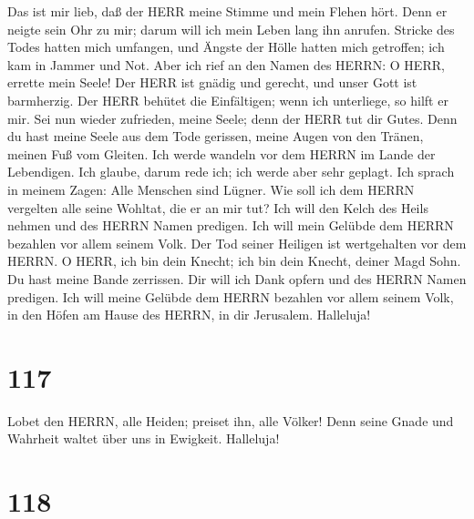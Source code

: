  Das ist mir lieb, daß der HERR meine Stimme und mein Flehen
hört.  Denn er neigte sein Ohr zu mir; darum will ich mein
Leben lang ihn anrufen.  Stricke des Todes hatten mich
umfangen, und Ängste der Hölle hatten mich getroffen; ich kam in Jammer
und Not.  Aber ich rief an den Namen des HERRN: O HERR,
errette mein Seele!  Der HERR ist gnädig und gerecht, und
unser Gott ist barmherzig.  Der HERR behütet die
Einfältigen; wenn ich unterliege, so hilft er mir.  Sei nun
wieder zufrieden, meine Seele; denn der HERR tut dir Gutes. 
Denn du hast meine Seele aus dem Tode gerissen, meine Augen von den
Tränen, meinen Fuß vom Gleiten.  Ich werde wandeln vor dem
HERRN im Lande der Lebendigen.  Ich glaube, darum rede ich;
ich werde aber sehr geplagt.  Ich sprach in meinem Zagen:
Alle Menschen sind Lügner.  Wie soll ich dem HERRN
vergelten alle seine Wohltat, die er an mir tut?  Ich will
den Kelch des Heils nehmen und des HERRN Namen predigen. 
Ich will mein Gelübde dem HERRN bezahlen vor allem seinem Volk.
 Der Tod seiner Heiligen ist wertgehalten vor dem HERRN.
 O HERR, ich bin dein Knecht; ich bin dein Knecht, deiner
Magd Sohn. Du hast meine Bande zerrissen.  Dir will ich
Dank opfern und des HERRN Namen predigen.  Ich will meine
Gelübde dem HERRN bezahlen vor allem seinem Volk,  in den
Höfen am Hause des HERRN, in dir Jerusalem. Halleluja!

\hypertarget{section-116}{%
\section{117}\label{section-116}}

 Lobet den HERRN, alle Heiden; preiset ihn, alle Völker!
 Denn seine Gnade und Wahrheit waltet über uns in Ewigkeit.
Halleluja!

\hypertarget{section-117}{%
\section{118}\label{section-117}}


